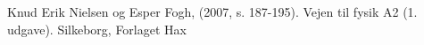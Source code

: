 \begin{thebibliography}{9}


 
  Knud Erik Nielsen og Esper Fogh,
  (2007, s. 187-195). 
  Vejen til fysik A2 (1. udgave). 
  Silkeborg,
  Forlaget Hax

  
  
\end{thebibliography}